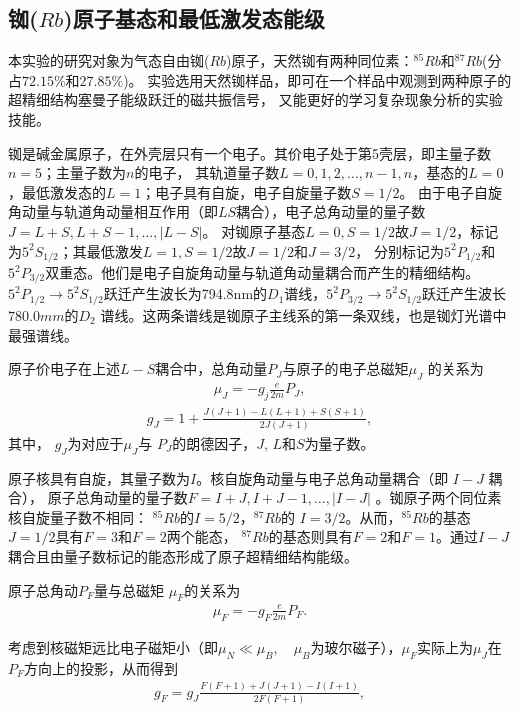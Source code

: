 \documentclass[11pt,a4paper]{article}
\begin{document}
\begin{spacing}{1.3}
\begin{CJK*}{UTF8}{gbsn}
\subsection{铷($Rb$)原子基态和最低激发态能级}
 本实验的研究对象为气态自由铷($Rb$)原子，天然铷有两种同位素：$^{85}Rb$和$^{87}Rb$(分占$72.15\%$和$27.85\%$)。
 实验选用天然铷样品，即可在一个样品中观测到两种原子的超精细结构塞曼子能级跃迁的磁共振信号，
 又能更好的学习复杂现象分析的实验技能。\par
 铷是碱金属原子，在外壳层只有一个电子。其价电子处于第5壳层，即主量子数$n=5$；主量子数为$n$的电子，
 其轨道量子数$L=0,1,2,\ldots,n-1,n$，基态的$L=0$，最低激发态的$L=1$；电子具有自旋，电子自旋量子数$S=1/2$。
 由于电子自旋角动量与轨道角动量相互作用（即$LS$耦合），电子总角动量的量子数$J=L+S,L+S-1,\ldots,|L-S|$。
 对铷原子基态$L=0,S=1/2$故$J=1/2$，标记为$5^2S_{1/2}$；其最低激发$L=1,S=1/2$故$J=1/2$和$J=3/2$，
 分别标记为$5^2P_{1/2}$和$5^2P_{3/2}$双重态。他们是电子自旋角动量与轨道角动量耦合而产生的精细结构。
 $5^2P_{1/2} \to 5^2S_{1/2}$跃迁产生波长为794.8nm的$D_1$谱线，$5^2P_{3/2} \to 5^2S_{1/2}$跃迁产生波长
 $780.0mm$的$D_2$ 谱线。这两条谱线是铷原子主线系的第一条双线，也是铷灯光谱中最强谱线。\par
原子价电子在上述$L-S$耦合中，总角动量$P_J$与原子的电子总磁矩$\mu_J$ 的关系为
\begin{eqnarray} \label{2-6-1}
  \mu_J=-g_j\frac{e}{2m}P_J,
\end{eqnarray}
\begin{eqnarray} \label{2-6-2}
  g_J=1+\frac{J(J+1)-L(L+1)+S(S+1)}{2J(J+1)},
\end{eqnarray}
其中， $g_J$为对应于$\mu_J$与 $P_J$的朗德因子，$J,\,L$和$S$为量子数。\par
原子核具有自旋，其量子数为$I$。核自旋角动量与电子总角动量耦合（即 $I-J$ 耦合），
原子总角动量的量子数$F=I+J,I+J-1,\ldots,|I-J|$ 。铷原子两个同位素核自旋量子数不相同：
$^{85}Rb$的$I=5/2$，$^{87}Rb$的 $I=3/2$。从而，$^{85}Rb$的基态$ J=1/2$具有$F=3$和$F=2$两个能态，
$^{87}Rb$的基态则具有$F =2$和$F =1$。通过$I-J$耦合且由量子数标记的能态形成了原子超精细结构能级。\par
原子总角动$P_F$量与总磁矩 $\mu_F$的关系为
\begin{eqnarray} \label{2-6-3}
 \mu_F=-g_F\frac{e}{2m}P_F.
\end{eqnarray}
\par
考虑到核磁矩远比电子磁矩小（即$\mu_N\ll \mu_B,\quad \mu_B$为玻尔磁子），$\mu_F$实际上为$\mu_J$在$P_F$方向上的投影，从而得到
  \begin{eqnarray} \label{2-6-4}
  g_F=g_J\frac{F(F+1)+J(J+1)-I(I+1)}{2F(F+1)},

\end{eqnarray}
\end{CJK*}
\end{spacing}
\end{document}
